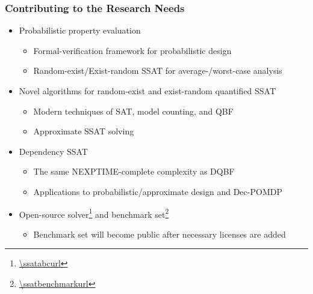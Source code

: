 \begin{frame}
      \frametitle{Contributing to the Research Needs}
      \begin{itemize}
            \item Probabilistic property evaluation
                  \pause
                  \begin{itemize}
                        \item Formal-verification framework for probabilistic design
                              \pause
                        \item Random-exist/Exist-random SSAT for average-/worst-case analysis
                              \pause
                  \end{itemize}
            \item Novel algorithms for random-exist and exist-random quantified SSAT
                  \pause
                  \begin{itemize}
                        \item Modern techniques of SAT, model counting, and QBF
                              \pause
                        \item Approximate SSAT solving
                              \pause
                  \end{itemize}
            \item Dependency SSAT
                  \pause
                  \begin{itemize}
                        \item The same NEXPTIME-complete complexity as DQBF
                              \pause
                        \item Applications to probabilistic/approximate design and Dec-POMDP
                              \pause
                  \end{itemize}
            \item Open-source solver\footnote{\url{\ssatabcurl}} and benchmark set\footnote{\url{\ssatbenchmarkurl}}
                  \pause
                  \begin{itemize}
                        \item Benchmark set will become public after necessary licenses are added
                  \end{itemize}
      \end{itemize}
\end{frame}